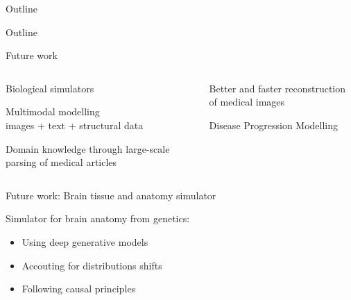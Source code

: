 \documentclass[8pt,xcolor=table]{beamer}
\begin{document}


\begin{frame}{Outline}

\end{frame}

% 

\begin{frame}{Outline}
 
 
\end{frame}

\begin{frame}{Future work}



\begin{columns}[t]
\begin{column}{0.5\textwidth}
\centering

Biological simulators\\

\vo

Multimodal modelling\\
images + text + structural data  

\vo

Domain knowledge through large-scale parsing of medical articles\\

\end{column}
\begin{column}{0.5\textwidth}
\centering

Better and faster reconstruction of medical images\\

\vo

Disease Progression Modelling

\end{column}
\end{columns}


\end{frame}


\begin{frame}{Future work: Brain tissue and anatomy simulator}


Simulator for brain anatomy from genetics:
\begin{itemize}
 \item Using deep generative models
 \item Accouting for distributions shifts
 \item Following causal principles
\end{itemize}

\vt


\end{frame}
\end{document}
